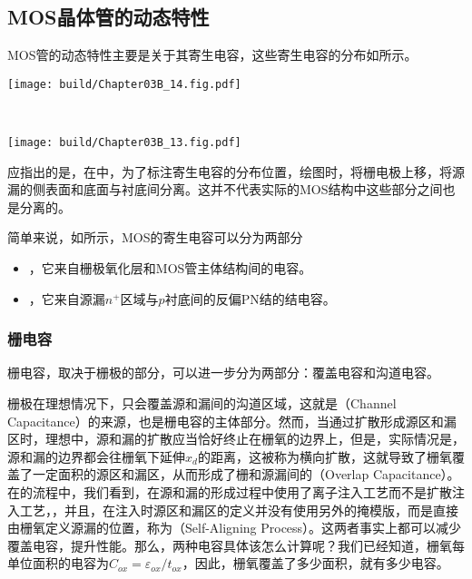 \subsection{MOS晶体管的动态特性}

MOS管的动态特性主要是关于其寄生电容，这些寄生电容的分布如所示。

\begin{Figure}[MOS管的电容分布]
    \begin{FigureSub}
        \texttt{[image: build/Chapter03B\_14.fig.pdf]}
    \end{FigureSub}\\ \vspace{0.25cm}
    \begin{FigureSub}
        \texttt{[image: build/Chapter03B\_13.fig.pdf]}
    \end{FigureSub}
\end{Figure}

应指出的是，在中，为了标注寄生电容的分布位置，绘图时，将栅电极上移，将源漏的侧表面和底面与衬底间分离。这并不代表实际的MOS结构中这些部分之间也是分离的。

简单来说，如所示，MOS的寄生电容可以分为两部分
\begin{itemize}
    \item {}，它来自栅极氧化层和MOS管主体结构间的电容。
    \item {}，它来自源漏$n^{+}$区域与$p$衬底间的反偏PN结的结电容。
\end{itemize}

\subsubsection{栅电容}
栅电容，取决于栅极的部分，可以进一步分为两部分：覆盖电容和沟道电容。

栅极在理想情况下，只会覆盖源和漏间的沟道区域，这就是（Channel Capacitance）的来源，也是栅电容的主体部分。然而，当通过扩散形成源区和漏区时，理想中，源和漏的扩散应当恰好终止在栅氧的边界上，但是，实际情况是，源和漏的边界都会往栅氧下延伸$x_d$的距离，这被称为横向扩散，这就导致了栅氧覆盖了一定面积的源区和漏区，从而形成了栅和源漏间的（Overlap Capacitance）。在的流程中，我们看到，在源和漏的形成过程中使用了离子注入工艺而不是扩散注入工艺，，并且，在注入时源区和漏区的定义并没有使用另外的掩模版，而是直接由栅氧定义源漏的位置，称为（Self-Aligning Process）。这两者事实上都可以减少覆盖电容，提升性能。那么，两种电容具体该怎么计算呢？我们已经知道，栅氧每单位面积的电容为$C_{ox}=\varepsilon_{ox}/t_{ox}$，因此，栅氧覆盖了多少面积，就有多少电容。

